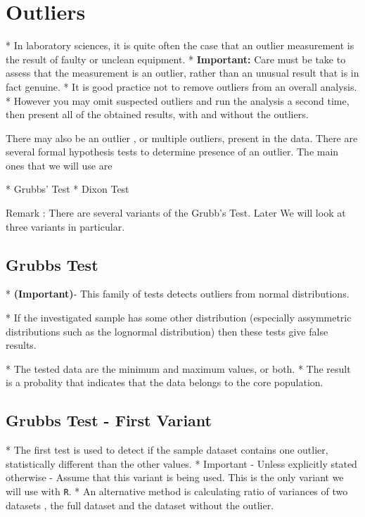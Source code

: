 

\section{Outliers} 




*  In laboratory sciences, it is quite often the case that an outlier measurement is the result of faulty or unclean equipment. 
*  \textbf{Important:} Care must be take to assess that the measurement is an outlier, rather than an unusual result that is in fact genuine.
*  It is good practice not to remove outliers from an overall analysis. 
*  However you may omit suspected outliers and run the analysis a second time, then present all of the obtained results, with and without the outliers.





There may also be an outlier , or multiple outliers, present in the data. There are several formal  hypothesis tests to determine presence of an outlier. The main ones that we will use are


*  Grubbs' Test
*  Dixon Test


Remark : There are several variants of the Grubb's Test. Later We will look at three variants in particular.


\subsection{Grubbs Test }



*  
\textbf{(Important)}- This family of tests detects outliers from normal distributions. 

*  If the investigated sample has some other distribution (especially
assymmetric distributions such as the lognormal distribution) then these tests give false results.

*  The tested data are the
minimum and maximum values, or both.  
*  The result is a probality that indicates that the data
belongs to the core population.



\subsection{Grubbs Test - First Variant}


*  The first test is used to detect if the sample dataset contains one outlier, statistically different than
the other values. 
*  Important - Unless explicitly stated otherwise - Assume that this variant is being used. This is the only variant we will use with \texttt{R}.
*   An alternative method is calculating ratio of
variances of two datasets , the full dataset and the dataset without the outlier.



